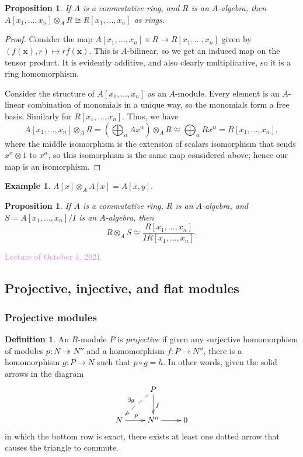 \documentclass{amsart}[12pt]
\newcommand{\onto}{\twoheadrightarrow}
\newcommand{\Oct}[1]{\textcolor{violet}{Lecture of October #1, 2021}}
\numberwithin{equation}{section}
\theoremstyle{plain} %
\newtheorem{prop}[equation]{Proposition}
\theoremstyle{definition}
\newtheorem{defn}[equation]{Definition}
\newtheorem{ex}[equation]{Example}
\theoremstyle{remark}
\newcommand{\ssec}[1]{\subsection{#1}}
\newcommand{\sssec}[1]{\subsubsection{#1}}
\begin{document}
\begin{prop} If $A$ is a commutative ring, and $R$ is an $A$-algebra, then $A[x_1,\dots,x_n] \otimes_A R\cong R[x_1,\dots,x_n]$ as rings.
\end{prop}
\begin{proof}
Consider the map $A[x_1,\dots,x_n] \times R \to R[x_1,\dots,x_n]$ given by $(f(\mathbf{x}),r) \mapsto r f(\mathbf{x})$. This is $A$-bilinear, so we get an induced map on the tensor product. It is evidently additive, and also clearly multiplicative, so it is a ring homomorphism.

Consider the structure of $A[x_1,\dots,x_n]$ as an $A$-module. Every element is an $A$-linear combination of monomials in a unique way, so the monomials form a free basis. Similarly for $R[x_1,\dots,x_n]$. Thus, we have 
\[A[x_1,\dots,x_n] \otimes_A R = (\bigoplus_{\alpha} A x^\alpha) \otimes_A R \cong \bigoplus_{\alpha} R x^\alpha = R[x_1,\dots,x_n],\]
where the middle isomorphism is the extension of scalars isomorphism that sends $x^\alpha \otimes 1$ to $x^\alpha$, so this isomorphism is the same map considered above; hence our map is an isomorphism.\end{proof}

\begin{ex} $A[x]\otimes_A A[x] = A[x,y]$. \end{ex}

\begin{prop} If $A$ is a commutative ring, $R$ is an $A$-algebra, and $S=A[x_1,\dots,x_n]/I$ is an $A$-algebra, then 
\[ R\otimes_A S \cong \frac{R[x_1,\dots, x_n] }{I R[x_1,\dots,x_n]}.\]
\end{prop}

\Oct{4}

\ssec{Projective, injective, and flat modules}

\sssec{Projective modules}

\begin{defn} An $R$-module $P$ is {\em projective} if given any surjective homomorphism of modules $p: N \onto N''$ and a homomorphism $f: P \to N''$, there
is a homomorphism $g: P \to N$ such that $p \circ g = h$. In other words, given the solid arrows in the diagram
$$
\xymatrix{
& P \ar[d]^f \ar@{-->}[dl]_{\exists g} \\
N \ar[r]^p & N'' \ar[r] & 0 \\
}
$$
in which the bottom row is exact, there exists at least one dotted arrow that causes the triangle to commute.
\end{defn}
\end{document}
